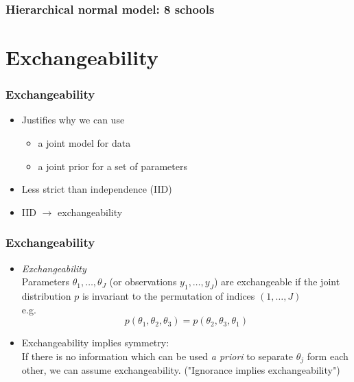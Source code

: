 \documentclass[10pt]{beamer}
\begin{document}
\begin{frame}

\frametitle{Hierarchical normal model: 8 schools}


\end{frame}


\section{Exchangeability}
\frame{\sectionpage}

\begin{frame}

\frametitle{Exchangeability}

  \begin{itemize}
  \item Justifies why we can use
    \begin{itemize}
    \item a joint model for data
    \item a joint prior for a set of parameters
    \end{itemize}
  \item Less strict than independence (IID)
  \item IID $\rightarrow$ exchangeability
  \end{itemize}
\end{frame}

\begin{frame}

\frametitle{Exchangeability}

  \begin{itemize}
  \item \textit{Exchangeability} \\ Parameters
    $\theta_1,\ldots,\theta_J$ (or observations $y_1,\ldots,y_J$) are
    exchangeable if the joint distribution $p$ is invariant to the
    permutation of indices $(1,\ldots,J)$\\
  e.g.
    \begin{equation*}
      p(\theta_1,\theta_2,\theta_3) = p(\theta_2,\theta_3,\theta_1)
    \end{equation*}
\pause
\pause
  \item Exchangeability implies symmetry: \\If there is no information
    which can be used \textit{a priori} to separate $\theta_j$ form
    each other, we can assume exchangeability. ("Ignorance implies exchangeability")

  \end{itemize}
\end{frame}
\end{document}
